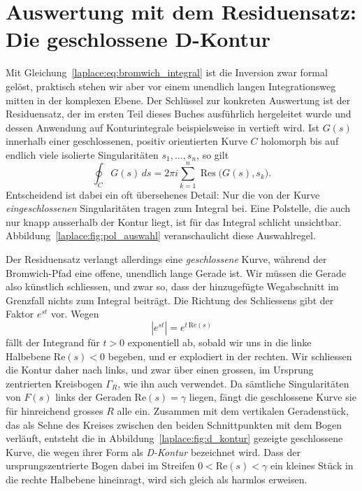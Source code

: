 %
%
\section{Auswertung mit dem Residuensatz: Die geschlossene D-Kontur}
\label{laplace:subsection:residuensatz}

Mit Gleichung~\eqref{laplace:eq:bromwich_integral} ist die Inversion zwar
formal gelöst, praktisch stehen wir aber vor einem unendlich langen
Integrationsweg mitten in der komplexen Ebene.
Der Schlüssel zur konkreten Auswertung ist der Residuensatz, der im ersten
Teil dieses Buches ausführlich hergeleitet wurde und dessen Anwendung auf
Konturintegrale beispielsweise in \cite{laplace:ablowitz2003} vertieft wird.
%
Ist $G(s)$ innerhalb einer geschlossenen, positiv orientierten Kurve $C$
holomorph bis auf endlich viele isolierte Singularitäten $s_1,\dots,s_n$,
so gilt
\begin{equation}
    \oint_C G(s) \, ds
    =
    2\pi i \sum_{k=1}^{n} \operatorname{Res}\bigl(G(s), s_k\bigr).
    \label{laplace:eq:residuensatz}
\end{equation}
Entscheidend ist dabei ein oft übersehenes Detail:
Nur die von der Kurve \emph{eingeschlossenen} Singularitäten tragen zum
Integral bei.
Eine Polstelle, die auch nur knapp ausserhalb der Kontur liegt, ist für das
Integral schlicht unsichtbar.
Abbildung~\ref{laplace:fig:pol_auswahl} veranschaulicht diese Auswahlregel.
%



Der Residuensatz verlangt allerdings eine \emph{geschlossene} Kurve, während
der Bromwich-Pfad eine offene, unendlich lange Gerade ist.
Wir müssen die Gerade also künstlich schliessen, und zwar so, dass der
hinzugefügte Wegabschnitt im Grenzfall nichts zum Integral beiträgt.
Die Richtung des Schliessens gibt der Faktor $e^{st}$ vor.
Wegen
\begin{equation}
    | e^{st} |
    =
    e^{t \, \text{Re}(s)}
    \label{laplace:eq:betrag_est}
\end{equation}
fällt der Integrand für $t > 0$ exponentiell ab, sobald wir uns in die linke
Halbebene $\text{Re}(s) < 0$ begeben, und er explodiert in der rechten.
Wir schliessen die Kontur daher nach links, und zwar über einen grossen,
im Ursprung zentrierten Kreisbogen $\Gamma_R$, wie ihn auch
\cite{laplace:carslaw1959} verwendet.
Da sämtliche Singularitäten von $F(s)$ links der Geraden
$\text{Re}(s) = \gamma$ liegen, fängt die geschlossene Kurve sie für
hinreichend grosses $R$ alle ein.
Zusammen mit dem vertikalen Geradenstück, das als Sehne des Kreises
zwischen den beiden Schnittpunkten mit dem Bogen verläuft, entsteht die
in Abbildung~\ref{laplace:fig:d_kontur} gezeigte geschlossene Kurve, die
wegen ihrer Form als \emph{D-Kontur} bezeichnet wird.
%
Dass der ursprungszentrierte Bogen dabei im Streifen
$0 < \text{Re}(s) < \gamma$ ein kleines Stück in die rechte Halbebene
hineinragt, wird sich gleich als harmlos erweisen.

